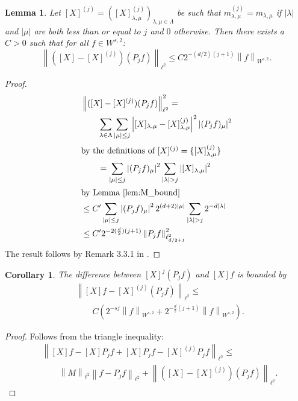 \documentclass[12pt]{amsart}
\newcommand{\abs}[1]{\left| #1 \right|}
\newcommand{\norm}[1]{\left\| #1 \right\|}
\newcommand{\card}[1]{\left| #1 \right|}
\newtheorem{cor}{Corollary}
\newtheorem{lem}{Lemma}
\begin{document}
\begin{lem} 
	Let $[X]^{(j)}=([X]^{(j)}_{\lambda,\mu})_{\lambda,\mu \in \Lambda}$ be such that $m^{(j)}_{\lambda,\mu} = m_{\lambda,\mu}$ if $\card{\lambda}$ and $\card{\mu}$ are both less than or equal to $j$ and $0$ otherwise. Then there exists a $C > 0$ such that for all $f \in W^{s,2}$:
	\begin{equation}
		\norm{( [X]- [X]^{(j)})(P_j f)}_{\ell^2} \leq C2^{-(d/2)(j+1)} \norm{f}_{W^{s,2}}.
	\end{equation}
\end{lem}
\begin{proof}
	\begin{align*}
		&\norm{([X]-[X]^{(j)})(P_j f)}_{\ell^2}^2 = \\
		&\qquad \sum_{\lambda \in \Lambda} \sum_{\card{\mu}\leq j} \abs{[X]_{\lambda,\mu}-[X]^{(j)}_{\lambda,\mu}}^2 \abs{(P_j f)_\mu}^2 \\
	\intertext{by the definitions of $[X]^{(j)} = \{ [X]_{\lambda,\mu}^{(j)} \}$ }
		&\qquad = \sum_{\card{\mu}\leq j}\abs{(P_j f)_\mu}^2 \sum_{\card{\lambda}>j}\abs{[X]_{\lambda,\mu}}^2 \\
	\intertext{by Lemma \ref{lem:M_bound}}
		 &\leq C'\sum_{\card{\mu}\leq j}\abs{(P_j f)_\mu}^2 2^{(d+2)\card{\mu}}\sum_{\card{\lambda}>j}2^{-d\card{\lambda}} \\
		 &\leq C' 2^{-2(\frac{d}{2})(j+1)}\norm{P_j f}^2_{\ell^2_{d/2+1}}
	\end{align*}
	The result follows by Remark 3.3.1 in \cite{Cohen2003}.
\end{proof}

\begin{cor}
	The difference between $[X]^j (P_j f)$ and $[X] f$ is bounded by
	\begin{align*}
		&\norm{[X]f - [X]^{(j)}(P_j f)}_{\ell^2} \leq \\
		&	\qquad  C \left( 2^{-sj}\norm{f}_{W^{s,2}} + 2^{-\frac{d}{2}(j+1)}\norm{f}_{W^{s,2}} \right).
	\end{align*}
\end{cor}
\begin{proof}
	Follows from the triangle inequality:
	\begin{align*}
		&\norm{[X]f - [X] P_j f + [X] P_j f - [X]^{(j)} P_j f}_{\ell^2} \leq \\
		&\qquad \norm{M}_{\ell^2} \norm{f - P_j f}_{\ell^2} + \norm{([X]-[X]^{(j)})(P_j f)}_{\ell^2}.
	\end{align*}
\end{proof}
\end{document}
